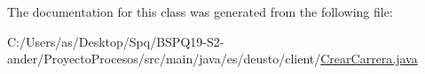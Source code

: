 The documentation for this class was generated from the following file\+:\begin{DoxyCompactItemize}
\item 
C\+:/\+Users/as/\+Desktop/\+Spq/\+B\+S\+P\+Q19-\/\+S2-\/ander/\+Proyecto\+Procesos/src/main/java/es/deusto/client/\mbox{\hyperlink{_crear_carrera_8java}{Crear\+Carrera.\+java}}\end{DoxyCompactItemize}

